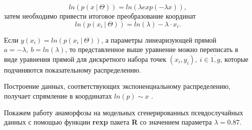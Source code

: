 \documentclass[
  14,
]{article}
\begin{document}
\[
ln(p(x\ |\ \Theta)) = ln(\lambda exp(-\lambda x)),
\] затем необходимо привести итоговое преобразование координат \[
ln(p(x_i\ |\ \Theta)) = ln(\lambda) - \lambda \cdot x_i.
\]

Если \(y(x_i) = ln(p(x_i\ |\ \Theta))\), а параметры линеаризующей
прямой \(a = -\lambda, \ b = ln(\lambda)\), то представленное выше
уравнение можно переписать в виде уравнения прямой для дискретного
набора точек \((x_i, y_i), \ i \in \overline{1, g}\), которые
подчиняются показательному распределению.

Построение данных, соответствующих экспоненциальному распределению,
получает спрямление в координатах \(ln(p) \sim x\) .

Покажем работу анаморфозы на модельных сгенерированных псевдослучайных
данных с помощью функции \textbf{rexp} пакета \textbf{R} со значением
параметра \(\lambda = 0.87\).

\[\ \]
\end{document}
